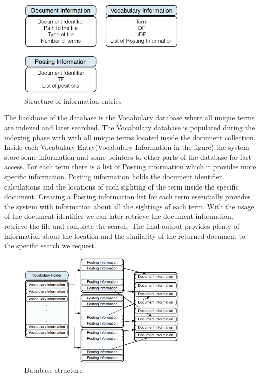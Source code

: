 \documentclass[letterpaper,10pt]{article}
\begin{document}
\begin{figure}[H]
    \centering
    \includegraphics[width=3.2in]{ClassInternals.eps}
    \caption{Structure of information entries}
    \label{Structure of information entries}
\end{figure}

The backbone of the database is the Vocabulary database where all unique terms are indexed and later searched. The Vocabulary database is populated during the indexing phase with with all unique terms located inside the document collection. Inside each Vocabulary Entry(Vocabulary Information in the figure) the system store some information and some pointers to other parts of the database for fast access. For each term there is a list of Posting information which it provides more specific information. Posting information holds the document identifier, calculations and the locations of each sighting of the term inside the specific document. Creating a Posting information list for each term essentially provides the system with information about all the sightings of each term. With the usage of the document identifier we can later retrieve the document information, retrieve the file and complete the search. The final output provides plenty of information about the location and the similarity of the returned document to the specific search we request.

\begin{figure}[H]
    \centering
    \includegraphics[width=3.2in]{DB.eps}
    \caption{Database structure}
    \label{Database structure}
\end{figure}
\end{document}
